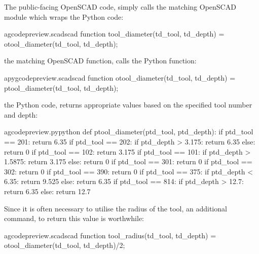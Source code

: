 \documentclass{ltxdoc}
\begin{document}
The public-facing OpenSCAD code, 
simply calls the matching OpenSCAD module which wraps the Python code:
 
\lstset{firstnumber=\thegcpscad}
\begin{writecode}{a}{gcodepreview.scad}{scad}
function tool_diameter(td_tool, td_depth) = otool_diameter(td_tool, td_depth);

\end{writecode}
\addtocounter{gcpscad}{2}

\noindent the matching OpenSCAD function,  
calls the Python function:

\lstset{firstnumber=\thepyscad}
\begin{writecode}{a}{pygcodepreview.scad}{scad}
function otool_diameter(td_tool, td_depth) = ptool_diameter(td_tool, td_depth);

\end{writecode}
\addtocounter{pyscad}{2}
 
\noindent the Python code,  returns 
appropriate values based on the specified tool number and depth:
 
\lstset{firstnumber=\thegcpy}
\begin{writecode}{a}{gcodepreview.py}{python}
def ptool_diameter(ptd_tool, ptd_depth):
    if ptd_tool == 201:
        return 6.35
    if ptd_tool == 202:
        if ptd_depth > 3.175:
            return 6.35
        else:
            return 0
    if ptd_tool == 102:
        return 3.175
    if ptd_tool == 101:
        if ptd_depth > 1.5875:
            return 3.175
        else:
            return 0
    if ptd_tool == 301:
        return 0
    if ptd_tool == 302:
        return 0
    if ptd_tool == 390:
        return 0
    if ptd_tool == 375:
        if ptd_depth < 6.35:
            return 9.525
        else:
            return 6.35
    if ptd_tool == 814:
        if ptd_depth > 12.7:
            return 6.35
        else:
            return 12.7

\end{writecode}
\addtocounter{gcpy}{32}

Since it is often necessary to utilise the radius of the tool, an additional command,
 to return this value is worthwhile:
 
\lstset{firstnumber=\thegcpscad}
\begin{writecode}{a}{gcodepreview.scad}{scad}
function tool_radius(td_tool, td_depth) = otool_diameter(td_tool, td_depth)/2;

\end{writecode}
\addtocounter{gcpscad}{2}
 
\end{document}
